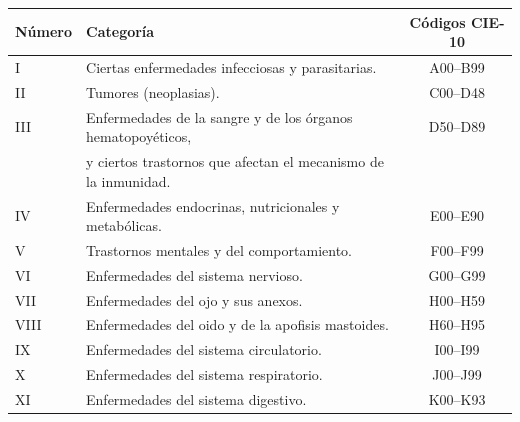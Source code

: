 \begin{tabular}{llc}
\midrule[1.5 pt]
\textbf{Número} & \textbf{Categoría}                                                                                                         & \textbf{Códigos CIE-10} \\
\hline
I               & Ciertas enfermedades infecciosas y parasitarias.                                                                           & A00–B99                 \\
II              & Tumores (neoplasias).                                                                                                      & C00–D48                 \\
III             & Enfermedades de la sangre y de los órganos hematopoyéticos, & D50–D89\\
& y ciertos trastornos que afectan el mecanismo de la inmunidad. &                 \\
IV              & Enfermedades endocrinas, nutricionales y metabólicas.                                                                      & E00–E90                 \\
V               & Trastornos mentales y del comportamiento.                                                                                  & F00–F99                 \\
VI              & Enfermedades del sistema nervioso.                                                                                         & G00–G99                 \\
VII             & Enfermedades del ojo y sus anexos.                                                                                         & H00–H59                 \\
VIII            & Enfermedades del oido y de la apofisis mastoides.                                                                          & H60–H95                 \\
IX              & Enfermedades del sistema circulatorio.                                                                                     & I00–I99                 \\
X               & Enfermedades del sistema respiratorio.                                                                                     & J00–J99                 \\
XI              & Enfermedades del sistema digestivo.                                                                                        & K00–K93                 \\

\end{tabular}
